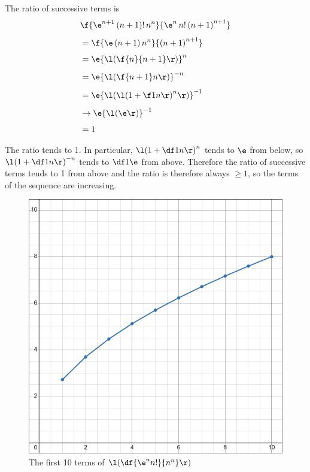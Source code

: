 \documentclass[a4paper]{article}
\begin{document}
The ratio of successive terms is \begin{align*}
& \f{\e^{n+1}\, (n+1)!\, n^n}{\e^n\, n!\, {(n+1)}^{n+1}}\\[1ex]
&= \f{\e\, (n+1)\, n^n}{{(n+1)}^{n+1}}\\[1ex]
&= \e {\l(\f{n}{n+1}\r)}^n\\[1ex]
&= \e {\l(\f{n+1}n\r)}^{-n}\\[1ex]
&= \e {\l({\l(1 + \f1n\r)}^n\r)}^{-1}\\[1ex]
&\to \e {\l(\e\r)}^{-1}\\[1ex]
&= 1
\end{align*}

The ratio tends to 1. In particular, ${\l(1 + \df1n\r)}^n$ tends to $\e$ from below, so ${\l(1 + \df1n\r)}^{-n}$ tends to $\df1\e$ from above. Therefore the ratio of successive terms tends to 1 from above and the ratio is therefore always $\ge 1$, so the terms of the sequence are increasing.

\begin{figure}[hbtp]
    \centering
    \includegraphics[scale=0.4]{Q4a}
    \caption{The first 10 terms of $\l(\df{\e^n n!}{n^n}\r)$}
\end{figure}
\end{document}
